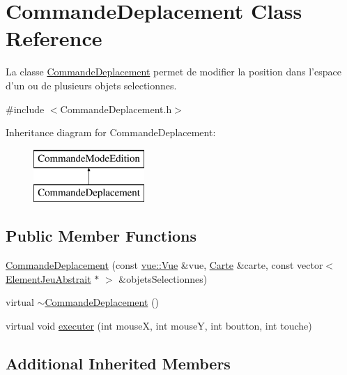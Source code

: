 \hypertarget{class_commande_deplacement}{\section{Commande\-Deplacement Class Reference}
\label{class_commande_deplacement}
}


La classe \hyperlink{class_commande_deplacement}{Commande\-Deplacement} permet de modifier la position dans l'espace d'un ou de plusieurs objets selectionnes.  




{\ttfamily \#include $<$Commande\-Deplacement.\-h$>$}

Inheritance diagram for Commande\-Deplacement\-:\begin{figure}[H]
\begin{center}
\leavevmode
\includegraphics[height=2.000000cm]{class_commande_deplacement}
\end{center}
\end{figure}
\subsection*{Public Member Functions}
\begin{DoxyCompactItemize}
\item 
\hyperlink{class_commande_deplacement_a4a68767331241858637dc60272c11d1e}{Commande\-Deplacement} (const \hyperlink{classvue_1_1_vue}{vue\-::\-Vue} \&vue, \hyperlink{class_carte}{Carte} \&carte, const vector$<$ \hyperlink{class_element_jeu_abstrait}{Element\-Jeu\-Abstrait} $\ast$ $>$ \&objets\-Selectionnes)
\item 
virtual \hyperlink{class_commande_deplacement_af5fcff826a06cb9cf11645c7a551af27}{$\sim$\-Commande\-Deplacement} ()
\item 
virtual void \hyperlink{class_commande_deplacement_a8a591ce694d95d57409f14597d0b1e9c}{executer} (int mouse\-X, int mouse\-Y, int boutton, int touche)
\end{DoxyCompactItemize}
\subsection*{Additional Inherited Members}


